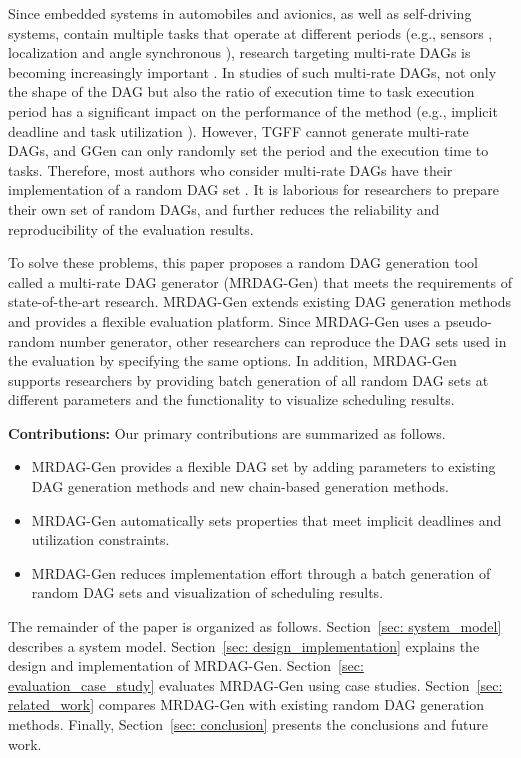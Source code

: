Since embedded systems in automobiles and avionics, as well as self-driving systems, contain multiple tasks that operate at different periods (e.g., sensors \cite{guanindustry}, localization \cite{verucchi2020latency} and angle synchronous \cite{hamann2017communication}), research targeting multi-rate DAGs is becoming increasingly important \cite{gunzel2021suspension, kordon2020evaluation}.
In studies of such multi-rate DAGs, not only the shape of the DAG but also the ratio of execution time to task execution period has a significant impact on the performance of the method (e.g., implicit deadline \cite{ueter2021hard, cho2021conditionally} and task utilization \cite{nogd2020response, yang2020mixed}).
However, TGFF cannot generate multi-rate DAGs, and GGen can only randomly set the period and the execution time to tasks.
Therefore, most authors who consider multi-rate DAGs have their implementation of a random DAG set \cite{voronov2021ai, dong2019efficient, yang2020mixed, nogd2020response}.
It is laborious for researchers to prepare their own set of random DAGs, and further reduces the reliability and reproducibility of the evaluation results.

To solve these problems, this paper proposes a random DAG generation tool called a multi-rate DAG generator (MRDAG-Gen) that meets the requirements of state-of-the-art research.
MRDAG-Gen extends existing DAG generation methods and provides a flexible evaluation platform.
Since MRDAG-Gen uses a pseudo-random number generator, other researchers can reproduce the DAG sets used in the evaluation by specifying the same options.
In addition, MRDAG-Gen supports researchers by providing batch generation of all random DAG sets at different parameters and the functionality to visualize scheduling results.

\textbf{Contributions: } Our primary contributions are summarized as follows.
\begin{itemize}
    \item MRDAG-Gen provides a flexible DAG set by adding parameters to existing DAG generation methods and new chain-based generation methods.
    \item MRDAG-Gen automatically sets properties that meet implicit deadlines and utilization constraints.
    \item MRDAG-Gen reduces implementation effort through a batch generation of random DAG sets and visualization of scheduling results.
\end{itemize}

The remainder of the paper is organized as follows.
Section~\ref{sec: system_model} describes a system model.
Section~\ref{sec: design_implementation} explains the design and implementation of MRDAG-Gen.
Section~\ref{sec: evaluation_case_study} evaluates MRDAG-Gen using case studies.
Section~\ref{sec: related_work} compares MRDAG-Gen with existing random DAG generation methods.
Finally, Section~\ref{sec: conclusion} presents the conclusions and future work.
